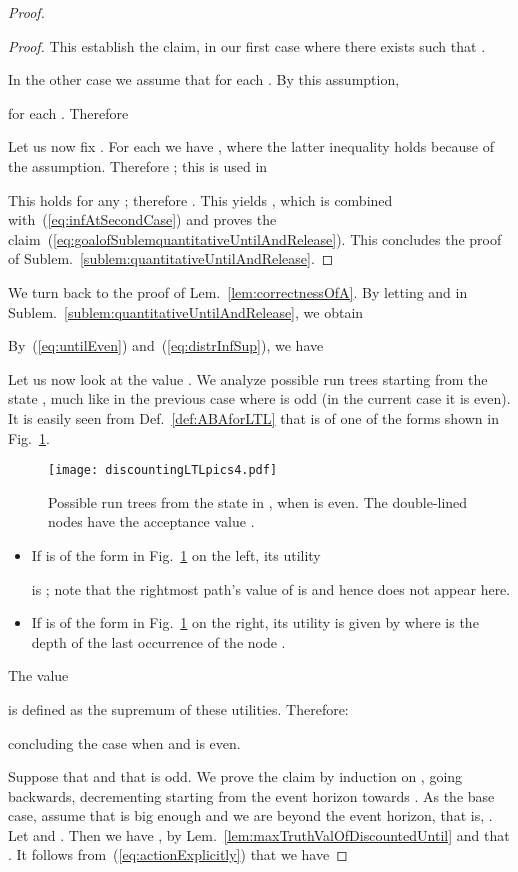 \documentclass[a4paper,USenglish,numberwithinsect]{lipics}
\theoremstyle{definition}
\theoremstyle{remark}
\theoremstyle{plain}
\begin{document}
\begin{proof}
\begin{proof}
This establish the claim, in our first case where there exists
    such that .

In the other case we assume  that  for each . By this assumption, 
  
  for each .
  Therefore
  
 
Let us now fix . For each  we have 
  , where the latter inequality holds because of the assumption.
Therefore ; this is used in

   This holds for any ; therefore
  .
 This yields
	, which is combined with~(\ref{eq:infAtSecondCase}) and 
   proves the claim~(\ref{eq:goalofSublemquantitativeUntilAndRelease}). 
This concludes the proof of
   Sublem.~\ref{sublem:quantitativeUntilAndRelease}. 
  \end{proof}

 We turn back to the proof of Lem.~\ref{lem:correctnessOfA}.
By letting  
and  in
 Sublem.~\ref{sublem:quantitativeUntilAndRelease}, we obtain
  

  By~(\ref{eq:untilEven}) and~(\ref{eq:distrInfSup}), we have
  
  Let us now look at the value 
. 
We analyze  possible run trees  starting from the state
, much like in the previous case where
  is odd (in the current case it is even). It is easily seen
 from Def.~\ref{def:ABAforLTL} that  is of one of the forms shown
 in Fig.~\ref{fig:untilRunTreeEven}.
\begin{figure}[tbp] 
\texttt{[image: discountingLTLpics4.pdf]}
 \caption{Possible run trees from the state  in , when  is
even. The double-lined nodes  have
 the acceptance value .}
\label{fig:untilRunTreeEven}
\end{figure}
\begin{itemize}
 \item 
  If  is of the form in Fig.~\ref{fig:untilRunTreeEven} on the left, its utility
   
  is 
 ; note that the rightmost path's value of  is 
 and hence does not appear here. 
 \item 
  If  is of the form in Fig.~\ref{fig:untilRunTreeEven} on the
       right, its utility    
  is given by
   where  is the depth of the last occurrence of the node .
\end{itemize}
The value 

is defined as the supremum of these utilities.  Therefore:
  
concluding the case when   and  is
 even. 


  Suppose that  and that
   is odd. 
 We prove the claim by induction on , going backwards, decrementing
  starting from the event
 horizon towards . As the base case, assume that  is big enough and we are
 beyond the event horizon, that is,  .
Let  and
  . 
Then we have
 , by   Lem.~\ref{lem:maxTruthValOfDiscountedUntil}
 and that . It follows
 from~(\ref{eq:actionExplicitly}) that we have 


\end{proof}
\end{document}

